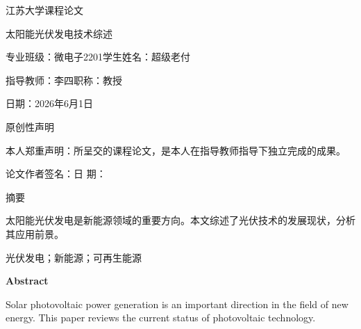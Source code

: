 \documentclass[12pt,a4paper]{ctexart}
\begin{document}
\begin{center}
    {\heiti{} 江苏大学课程论文}
    
    \vspace{2cm}
    
    {\heiti{} 太阳能光伏发电技术综述}
    
    \vspace{3cm}
    
    {\songti{}
    专业班级：微电子2201\hspace{3em}学生姓名：超级老付
    
    \vspace{0.5cm}
    
    指导教师：李四\hspace{4.5em}职\quad 称：教授   %
    
    \vspace{2cm}
    
    日\quad 期：2026年6月1日   %
    }
\end{center}

\newpage
\begin{center}
    {\heiti{} 原创性声明}
\end{center}
本人郑重声明：所呈交的课程论文，是本人在指导教师指导下独立完成的成果。\par
\hspace{2em}论文作者签名：\hspace{2cm}日 期：\hspace{2cm}

\newpage

\begin{center}
    {\heiti{} 摘\quad 要}
\end{center}

太阳能光伏发电是新能源领域的重要方向。本文综述了光伏技术的发展现状\cite{ref1}，分析其应用前景。

\vspace{12bp}
 光伏发电；新能源；可再生能源

\newpage
\begin{center}
    {\bfseries{} Abstract}
\end{center}

Solar photovoltaic power generation is an important direction in the field of new energy. This paper reviews the current status of photovoltaic technology\cite{ref1}.
\end{document}
